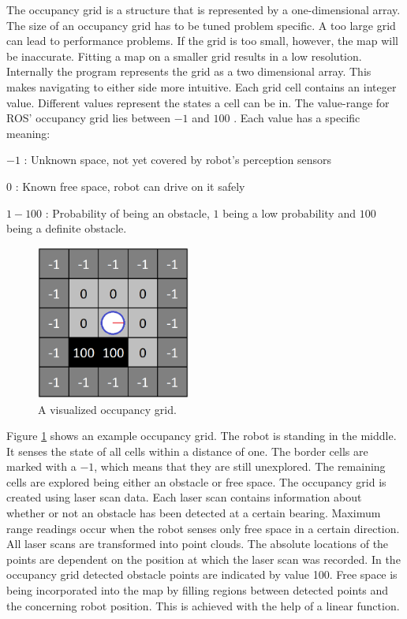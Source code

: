 \documentclass{ba-kecs}
\begin{document}
The occupancy grid is a structure that is represented by a one-dimensional array. The size of an occupancy grid has to be tuned problem specific. A too large grid can lead to performance problems. If the grid is too small, however, the map will be inaccurate. Fitting a map on a smaller grid results in a low resolution.
Internally the program represents the grid as a two dimensional array. This makes navigating to either side more intuitive. Each grid cell contains an integer value. Different values represent the states a cell can be in. The value-range for ROS' occupancy grid lies between $-1$ and $100$ \cite{occupancy}. Each value has a specific meaning:
\begin{description}
\item{$-1$} : Unknown space, not yet covered by robot's perception sensors
\item{$0$} : Known free space, robot can drive on it safely
\item{$1-100$} : Probability of being an obstacle, $1$ being a low probability and $100$ being a definite obstacle.
\end{description}
\begin{figure}[htbp]
	\centering
		\includegraphics[width=0.45\textwidth]{figures/Occup.png}
	\caption{A visualized occupancy grid.}
	\label{fig:Occupancy}
\end{figure}
Figure \ref{fig:Occupancy} shows an example occupancy grid. The robot is standing in the middle. It senses the state of all cells within a distance of one. The border cells are marked with a $-1$, which means that they are still unexplored. The remaining cells are explored being either an obstacle or free space.
The occupancy grid is created using laser scan data. Each laser scan contains information about whether or not an obstacle has been detected at a certain bearing. Maximum range readings occur when the robot senses only free space in a certain direction. All laser scans are transformed into point clouds. The absolute locations of the points are dependent on the position at which the laser scan was recorded.
In the occupancy grid detected obstacle points are indicated by value 100.
Free space is being incorporated into the map by filling regions between detected points and the concerning robot position. This is achieved with the help of a linear function. 
\end{document}
